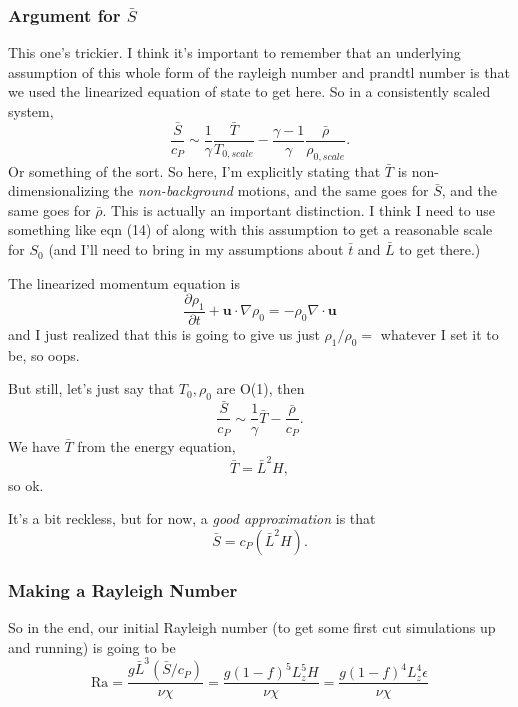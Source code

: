 \documentclass[aps, pre, onecolumn, nofootinbib, notitlepage, groupedaddress, amsfonts, amssymb, amsmath, longbibliography]{revtex4-1}
\newcommand{\grad}{\ensuremath{\nabla}}
\begin{document}
\subsubsection{Argument for $\bar{S}$}
This one's trickier.  I think it's important to remember that an underlying assumption of
this whole form of the rayleigh number and prandtl number is that we used the linearized equation
of state to get here.  So in a consistently scaled system,
$$
\frac{\bar{S}}{c_P} \sim \frac{1}{\gamma}\frac{\bar{T}}{T_{0, scale}} - \frac{\gamma-1}{\gamma}\frac{\bar{\rho}}{\rho_{0, scale}}.
$$
Or something of the sort.  So here, I'm explicitly stating that $\bar{T}$ is non-dimensionalizing the
\emph{non-background} motions, and the same goes for $\bar{S}$, and the same goes for $\bar{\rho}$. 
This is actually an important distinction. I think I need to use something like eqn (14) of
\cite{brown&all2012} along with this assumption to get a reasonable scale for $S_0$
(and I'll need to bring in my assumptions about $\bar{t}$ and $\bar{L}$ to get there.)

The linearized momentum equation \citep{brown&all2012} is
\begin{equation}
\frac{\partial \rho_1}{\partial t} + \bm{u}\cdot\grad\rho_0 = -\rho_0 \grad\cdot\bm{u}
\end{equation}
and I just realized that this is going to give us just $\rho_1/\rho_0 = $ whatever I set
it to be, so oops.

But still, let's just say that $T_0, \rho_0$ are O(1), then
$$
\frac{\bar{S}}{c_P} \sim \frac{1}{\gamma}\bar{T} - \frac{\bar{\rho}}{c_P}.
$$
We have $\bar{T}$ from the energy equation,
$$
\bar{T} = \bar{L}^2 H,
$$
so ok.

It's a bit reckless, but for now, a \emph{good approximation} is that
\begin{equation}
\bar{S} = c_P(\bar{L}^2 H).
\end{equation}

\subsubsection{Making a Rayleigh Number}
So in the end, our initial Rayleigh number (to get some first cut simulations up and running)
is going to be
\begin{equation}
\text{Ra} = \frac{g \bar{L}^3 (\bar{S}/c_P)}{\nu\chi} = \frac{g (1 - f)^5 L_z^5 H}{\nu\chi} = 
\frac{g (1 - f)^4 L_z ^4 \epsilon }{\nu\chi}
\end{equation}



\end{document}
